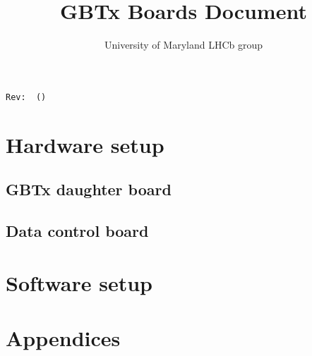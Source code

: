 \documentclass[11pt,letterpaper]{refart}
\title{GBTx Boards Document}
\author{University of Maryland LHCb group}
\begin{document}
\maketitle
\hfill\small{\texttt{Rev:~\gitRel~(\gitAbbrevHash)}}
\tableofcontents
\listoffigures
\clearpage

\section{Hardware setup}
\subsection{GBTx daughter board}







\subsection{Data control board}









\section{Software setup}







\newpage \appendix
\section*{Appendices}
\renewcommand{\thesubsection}{\Alph{subsection}}






\end{document}
